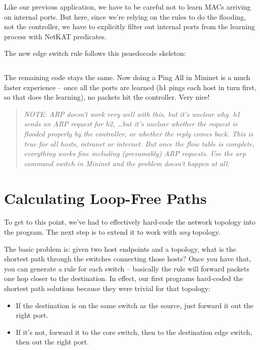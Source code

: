 Like our previous application, we have to be careful not to learn MACs arriving on internal ports.
But here, since we're relying on the rules to do the flooding, not the controller, we have to 
explicitly filter out internal ports from the learning process with NetKAT predicates.

The new edge switch rule follows this psuedocode skeleton:

\inputminted[firstline=34,lastline=54]{python}{code/multiswitch_topologies/multiswitch2.py}

The remaining code stays the same.  Now doing a Ping All in Mininet is a much faster experience -- once all the
ports are learned (h1 pings each host in turn first, so that does the learning), no packets hit the controller.
Very nice!

\begin{quotation}
\emph{NOTE:  ARP doesn't work very well with this, but it's unclear why.  h1 sends an ARP request for
h2, \ldots but it's unclear whether the request is flooded properly by the controller, or whether the
reply comes back.  This is true for all hosts, intranet or internet.  But once the flow table is complete,
everything works fine including (presumably) ARP requests.   Use the arp command switch in Mininet 
and the problem doesn't happen at all.   }
\end{quotation}


\section{Calculating Loop-Free Paths}

To get to this point, we've had to effectively hard-code the network topology into the program.  The next step
is to extend it to work with \emph{any} topology.  

The basic problem is: given two host endpoints and a topology, what is the shortest path through the switches 
connecting those hosts?  Once you have that, you can generate a rule for each switch -- basically the 
rule will forward packets one hop closer to the destination.  In effect, our first programs hard-coded the shortest
path solutions because they were trivial for that topology:

\begin{itemize}
\item If the destination is on the same switch as the source, just forward it out the right port.
\item If it's not, forward it to the core switch, then to the destination edge switch, then out the right port.
\end{itemize}


